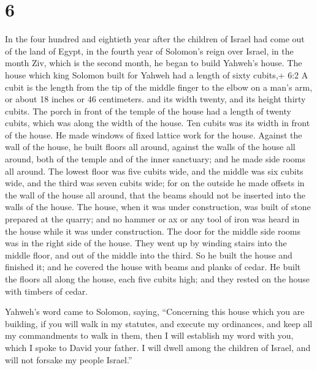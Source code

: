 \hypertarget{section-5}{%
\section{6}\label{section-5}}

 In the four hundred and eightieth year after the children
of Israel had come out of the land of Egypt, in the fourth year of
Solomon's reign over Israel, in the month Ziv, which is the second
month, he began to build Yahweh's house.  The house which
king Solomon built for Yahweh had a length of sixty cubits,+ 6:2 A cubit
is the length from the tip of the middle finger to the elbow on a man's
arm, or about 18 inches or 46 centimeters. and its width twenty, and its
height thirty cubits.  The porch in front of the temple of
the house had a length of twenty cubits, which was along the width of
the house. Ten cubits was its width in front of the house. 
He made windows of fixed lattice work for the house. 
Against the wall of the house, he built floors all around, against the
walls of the house all around, both of the temple and of the inner
sanctuary; and he made side rooms all around.  The lowest
floor was five cubits wide, and the middle was six cubits wide, and the
third was seven cubits wide; for on the outside he made offsets in the
wall of the house all around, that the beams should not be inserted into
the walls of the house.  The house, when it was under
construction, was built of stone prepared at the quarry; and no hammer
or ax or any tool of iron was heard in the house while it was under
construction.  The door for the middle side rooms was in the
right side of the house. They went up by winding stairs into the middle
floor, and out of the middle into the third.  So he built
the house and finished it; and he covered the house with beams and
planks of cedar.  He built the floors all along the house,
each five cubits high; and they rested on the house with timbers of
cedar.

 Yahweh's word came to Solomon, saying, 
``Concerning this house which you are building, if you will walk in my
statutes, and execute my ordinances, and keep all my commandments to
walk in them, then I will establish my word with you, which I spoke to
David your father.  I will dwell among the children of
Israel, and will not forsake my people Israel.''

